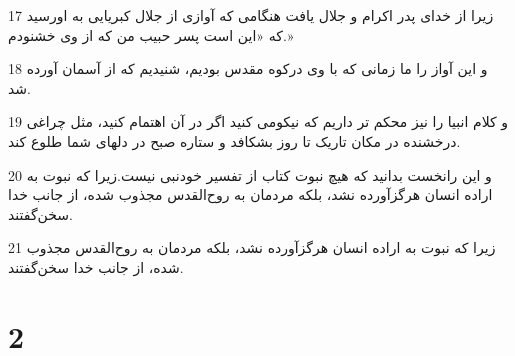 \par 17 زیرا از خدای پدر اکرام و جلال یافت هنگامی که آوازی از جلال کبریایی به اورسید که «این است پسر حبیب من که از وی خشنودم.»
\par 18 و این آواز را ما زمانی که با وی درکوه مقدس بودیم، شنیدیم که از آسمان آورده شد.
\par 19 و کلام انبیا را نیز محکم تر داریم که نیکومی کنید اگر در آن اهتمام کنید، مثل چراغی درخشنده در مکان تاریک تا روز بشکافد و ستاره صبح در دلهای شما طلوع کند.
\par 20 و این رانخست بدانید که هیچ نبوت کتاب از تفسیر خودنبی نیست.زیرا که نبوت به اراده انسان هرگزآورده نشد، بلکه مردمان به روح‌القدس مجذوب شده، از جانب خدا سخن‌گفتند.
\par 21 زیرا که نبوت به اراده انسان هرگزآورده نشد، بلکه مردمان به روح‌القدس مجذوب شده، از جانب خدا سخن‌گفتند.

\chapter{2}

